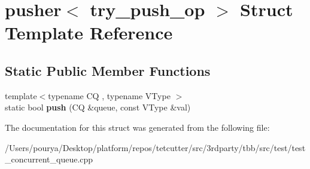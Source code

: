 \hypertarget{structpusher_3_01try__push__op_01_4}{}\section{pusher$<$ try\+\_\+push\+\_\+op $>$ Struct Template Reference}
\label{structpusher_3_01try__push__op_01_4}
\subsection*{Static Public Member Functions}
\begin{DoxyCompactItemize}
\item 
\hypertarget{structpusher_3_01try__push__op_01_4_a3d2fe216ce8629ac6af704e6203b05d6}{}{\footnotesize template$<$typename C\+Q , typename V\+Type $>$ }\\static bool {\bfseries push} (C\+Q \&queue, const V\+Type \&val)\label{structpusher_3_01try__push__op_01_4_a3d2fe216ce8629ac6af704e6203b05d6}

\end{DoxyCompactItemize}


The documentation for this struct was generated from the following file\+:\begin{DoxyCompactItemize}
\item 
/\+Users/pourya/\+Desktop/platform/repos/tetcutter/src/3rdparty/tbb/src/test/test\+\_\+concurrent\+\_\+queue.\+cpp\end{DoxyCompactItemize}
